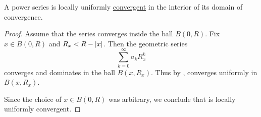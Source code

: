 \begin{proposition}\label{thm:power_series_are_locally_uniform_convergent}
  A power series is locally uniformly \hyperref[def:function_net_convergence/locally_uniform]{convergent} in the interior of its domain of convergence.
\end{proposition}
\begin{proof}
  Assume that the series  converges inside the ball \( B(0, R) \). Fix \( x \in B(0, R) \) and \( R_x < R - \left\vert x \right\vert \). Then the geometric series
  \begin{equation*}
    \sum_{k=0}^\infty a_k R_x^k
  \end{equation*}
  converges and dominates  in the ball \( B(x, R_x) \). Thus by ,  converges uniformly in \( B(x, R_x) \).

  Since the choice of \( x \in B(0, R) \) was arbitrary, we conclude that  is locally uniformly convergent.
\end{proof}

